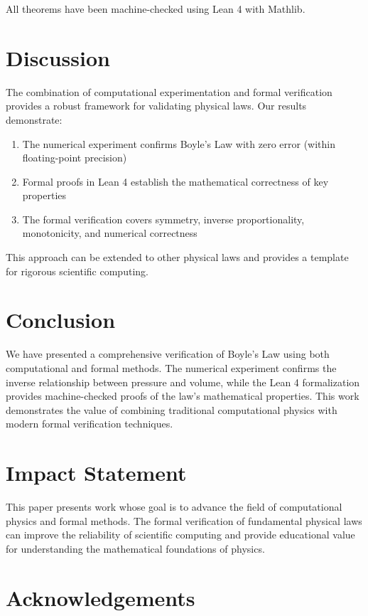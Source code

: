 \documentclass{article}
\theoremstyle{plain}
\theoremstyle{definition}
\theoremstyle{remark}
\begin{document}
All theorems have been machine-checked using Lean 4 with Mathlib.

\section{Discussion}

The combination of computational experimentation and formal verification provides a robust framework for validating physical laws. Our results demonstrate:

\begin{enumerate}
  \item The numerical experiment confirms Boyle's Law with zero error (within floating-point precision)
  \item Formal proofs in Lean 4 establish the mathematical correctness of key properties
  \item The formal verification covers symmetry, inverse proportionality, monotonicity, and numerical correctness
\end{enumerate}

This approach can be extended to other physical laws and provides a template for rigorous scientific computing.

\section{Conclusion}

We have presented a comprehensive verification of Boyle's Law using both computational and formal methods. The numerical experiment confirms the inverse relationship between pressure and volume, while the Lean 4 formalization provides machine-checked proofs of the law's mathematical properties. This work demonstrates the value of combining traditional computational physics with modern formal verification techniques.

\section*{Impact Statement}

This paper presents work whose goal is to advance the field of computational physics and formal methods. The formal verification of fundamental physical laws can improve the reliability of scientific computing and provide educational value for understanding the mathematical foundations of physics.

\section*{Acknowledgements}
\end{document}
